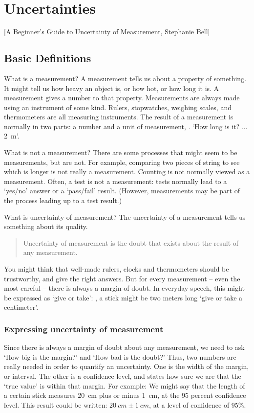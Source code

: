 \section{Uncertainties}

[A Beginner's Guide to Uncertainty of Measurement, Stephanie Bell]

\subsection{Basic Definitions}
What is a measurement? A measurement tells us about a property of something. It might tell us how heavy an object is, or how hot, or how long it is. A measurement gives a number to that property. Measurements are always made using an instrument of some kind. Rulers, stopwatches, weighing scales, and thermometers are all measuring instruments. The result of a measurement is normally in two parts: a number and a unit of measurement, \eg. `How long is it? ... \SI{2}{m}'.

What is not a measurement? There are some processes that might seem to be measurements, but are not. For example, comparing two pieces of string to see which is longer is not really a measurement. Counting is not normally viewed as a measurement. Often, a test is not a measurement: tests normally lead to a `yes/no' answer or a `pass/fail' result. (However, measurements may be part of the process leading up to a test result.)

What is uncertainty of measurement? The uncertainty of a measurement tells us something about its quality.
\begin{quote}
Uncertainty of measurement is the doubt that exists about the result of any measurement.
\end{quote}
You might think that well-made rulers, clocks and thermometers should be trustworthy, and give the right answers. But for every measurement -- even the most careful -- there is always a margin of doubt. In everyday speech, this might be expressed as `give or take': \eg, a stick might be two meters long `give or take a centimeter'.


\subsubsection{Expressing uncertainty of measurement}
Since there is always a margin of doubt about any measurement, we need to ask `How big is the margin?' and `How bad is the doubt?' Thus, two numbers are really needed in order to quantify an uncertainty. One is the width of the margin, or interval. The other is a confidence level, and states how sure we are that the `true value' is within that margin. For example: We might say that the length of a certain stick measures \SI{20}{cm} plus or minus \SI{1}{cm}, at the 95 percent confidence level. This result could be written: $\SI{20}{cm}\pm\SI{1}{cm}$, at a level of confidence of 95\%.

